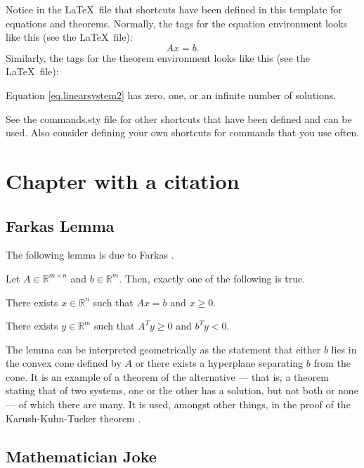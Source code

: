 \documentclass[11pt]{report}
\begin{document}
Notice in the \LaTeX\ file that shortcuts have been defined in this template for equations and theorems.  Normally, the tags for the equation environment looks like this (see the \LaTeX\ file):
\begin{equation}\label{eq.linearsystem2}
  Ax=b.
\end{equation}
Similarly, the tags for the theorem environment looks like this (see the \LaTeX\ file):
\begin{theorem}
  Equation \eqref{eq.linearsystem2} has zero, one, or an infinite number of solutions.
\end{theorem}
See the commands.sty file for other shortcuts that have been defined and can be used.  Also consider defining your own shortcuts for commands that you use often.

\chapter{Chapter with a citation}

\section{Farkas Lemma}

The following lemma is due to Farkas \cite{Fark02}.

\blemma
  Let $A \in \mathbb{R}^{m \times n}$ and $b \in \mathbb{R}^m$.  Then, exactly one of the following is true.
  \benumerate
    \item There exists $x \in \mathbb{R}^n$ such that $Ax=b$ and $x \geq 0$.
    \item There exists $y \in \mathbb{R}^m$ such that $A^Ty \geq 0$ and $b^Ty < 0$.
  \eenumerate
\elemma

The lemma can be interpreted geometrically as the statement that either $b$ lies in the convex cone defined by $A$ or there exists a hyperplane separating $b$ from the cone.  It is an example of a theorem of the alternative --- that is, a theorem stating that of two systems, one or the other has a solution, but not both or none --- of which there are many.  It is used, amongst other things, in the proof of the Karush-Kuhn-Tucker theorem \cite{Karu39,KuhnTuck51}.

\section{Mathematician Joke}
\end{document}
